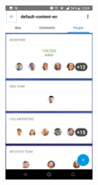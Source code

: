 \begin{figure}[!h]
	\begin{center}
		\includegraphics[width=0.3\textwidth]{./img/anexo1/ver_idea_gente.png}

\end{center}
\end{figure}
